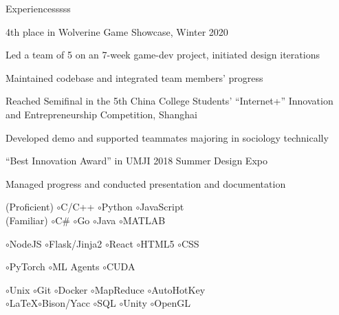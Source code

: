 \documentclass[12pt,a4paper]{article}
\newcommand{\datesmash}[1]{\hspace{\fill}{\smash{\textmd{$|$ #1 $|$}}}}
\newcommand{\bl}{\hspace{2px}$\circ$\hspace{5px}}
\begin{document}
\begin{labeling}{Experiencesssss}
\begin{compactlist2}
  \item 4th place in Wolverine Game Showcase, Winter 2020
  \datesmash{2020.4}
  \begin{compactlist2}
    \item Led a team of 5 on an 7-week game-dev project, initiated design iterations
    \item Maintained codebase and integrated team members' progress 
  \end{compactlist2}

  \item Reached Semifinal in the 5th China College Students' ``Internet+'' Innovation\\ and Entrepreneurship Competition, Shanghai
  \datesmash{2019.5}
  \begin{compactlist2}
    \item Developed demo and supported teammates majoring in sociology technically
  \end{compactlist2}

  \item ``Best Innovation Award'' in UMJI 2018 Summer Design Expo 
  \datesmash{2018.8}
  \begin{compactlist2}
    \item Managed progress and conducted presentation and documentation
  \end{compactlist2}

\end{compactlist2}

\item [\textbf{\parbox[b][9pt][t]{1.03in}{Skills}}]
\begin{compactlist1}
  \item {}
  (Proficient) \bl C/C++ \bl Python \bl JavaScript\\ \hspace{2cm}
  (Familiar) \bl C\# \bl Go \bl Java \bl MATLAB
  \item {}
  \bl NodeJS \bl Flask/Jinja2 \bl React \bl HTML5 \bl CSS
  \item {}
  \bl PyTorch \bl ML Agents \bl CUDA
  \item {}
  \bl Unix \bl Git \bl Docker \bl MapReduce \bl AutoHotKey\\ \hspace{2cm}
  \bl \LaTeX \bl Bison/Yacc \bl SQL \bl Unity \bl OpenGL
\end{compactlist1}

\end{labeling}
\end{document}

